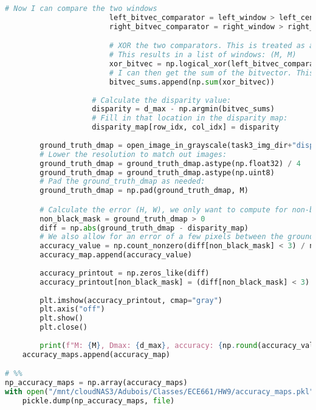 \documentclass{article}
\begin{document}
\begin{lstlisting}[language=Python]
                        # Now I can compare the two windows
                        left_bitvec_comparator = left_window > left_center_pixel_window
                        right_bitvec_comparator = right_window > right_center_pixel_window

                        # XOR the two comparators. This is treated as a bitwise XOR since the bits are represented as logical True/False values
                        # This results in a list of windows: (M, M)
                        xor_bitvec = np.logical_xor(left_bitvec_comparator, right_bitvec_comparator)
                        # I can then get the sum of the bitvector. This is the data cost
                        bitvec_sums.append(np.sum(xor_bitvec))
                        
                    # Calculate the disparity value:
                    disparity = d_max - np.argmin(bitvec_sums)
                    # Fill in that location in the disparity map:
                    disparity_map[row_idx, col_idx] = disparity
        
        ground_truth_dmap = open_image_in_grayscale(task3_img_dir+"disp2.png")
        # Lower the resolution to match out images:
        ground_truth_dmap = ground_truth_dmap.astype(np.float32) / 4
        ground_truth_dmap = ground_truth_dmap.astype(np.uint8)
        # Pad the ground_truth_dmap as needed:
        ground_truth_dmap = np.pad(ground_truth_dmap, M)

        # Calculate the error (H, W), we only want to compute for non-black (padded) pixels
        non_black_mask = ground_truth_dmap > 0
        diff = np.abs(ground_truth_dmap - disparity_map)
        # We also allow for an error of a few pixels between the ground truth and the computed disparity map
        accuracy_value = np.count_nonzero(diff[non_black_mask] < 3) / np.count_nonzero(non_black_mask)
        accuracy_map.append(accuracy_value)
        
        accuracy_printout = np.zeros_like(diff)
        accuracy_printout[non_black_mask] = (diff[non_black_mask] < 3) * 255
        
        plt.imshow(accuracy_printout, cmap="gray")
        plt.axis("off")
        plt.show()
        plt.close()
        
        print(f"M: {M}, Dmax: {d_max}, accuracy: {np.round(accuracy_value * 100, 4)}")
    accuracy_maps.append(accuracy_map)

# %%
np_accuracy_maps = np.array(accuracy_maps)
with open("/mnt/cloudNAS3/Adubois/Classes/ECE661/HW9/accuracy_maps.pkl", "wb") as file:
    pickle.dump(np_accuracy_maps, file)


\end{lstlisting}
\end{document}
